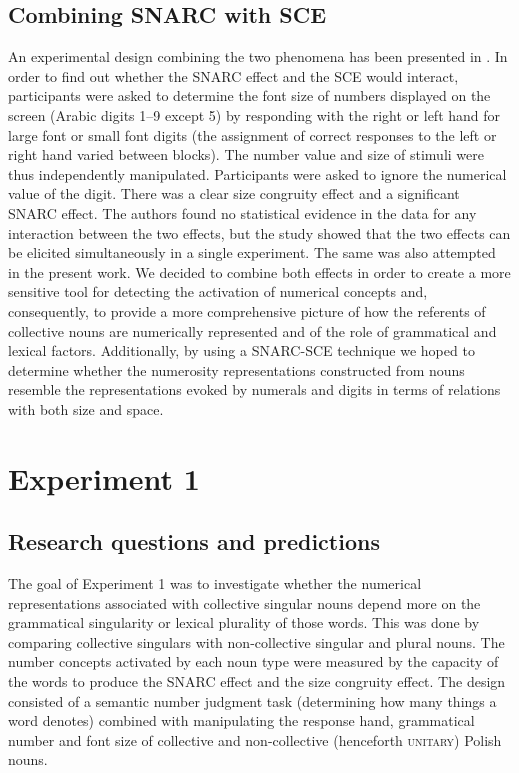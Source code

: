 \documentclass[output=paper]{langscibook}
\begin{document}
\subsection{Combining SNARC with SCE}
An experimental design combining the two phenomena has been presented in \citet{fitousiRoleParityPhysical2009}. In order to find out whether the SNARC effect and the SCE would interact, participants were asked to determine the font size of numbers displayed on the screen (Arabic digits 1--9 except 5) by responding with the right or left hand for large font or small font digits (the assignment of correct responses to the left or right hand varied between blocks). The number value and size of stimuli were thus independently manipulated. Participants were asked to ignore the numerical value of the digit. There was a clear size congruity effect and a significant SNARC effect. The authors found no statistical evidence in the data for any interaction between the two effects, but the study showed that the two effects can be elicited simultaneously in a single experiment. The same was also attempted in the present work. We decided to combine both effects in order to create a more sensitive tool for detecting the activation of numerical concepts and, consequently, to provide a more comprehensive picture of how the referents of collective nouns are numerically represented and of the role of grammatical and lexical factors. Additionally, by using a SNARC-SCE technique we hoped to determine whether the numerosity representations constructed from nouns resemble the representations evoked by numerals and digits in terms of relations with both size and space.

\section{Experiment 1}

\subsection{Research questions and predictions}
The goal of Experiment 1 was to investigate whether the numerical representations associated with collective singular nouns depend more on the grammatical singularity or lexical plurality of those words. This was done by comparing collective singulars with non-collective singular and plural nouns. The number concepts activated by each noun type were measured by the capacity of the words to produce the SNARC effect and the size congruity effect. The design consisted of a semantic number judgment task (determining how many things a word denotes) combined with manipulating the response hand, grammatical number and font size of collective and non-collective (henceforth \textsc{unitary}) Polish nouns.
\end{document}

